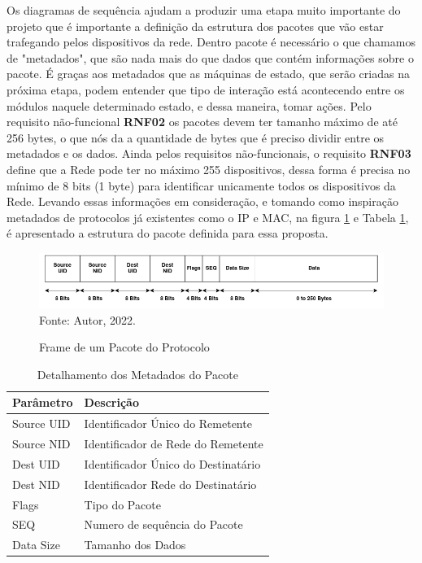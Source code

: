 Os diagramas de sequência ajudam a produzir uma etapa muito
importante do projeto que é importante a definição da
estrutura dos pacotes que vão estar trafegando pelos dispositivos da rede.
Dentro pacote é necessário o que chamamos de "metadados", que são
nada mais do que dados que contém informações sobre o pacote.
É graças aos metadados que as máquinas de estado, que serão criadas na próxima etapa,
podem entender que tipo de interação está acontecendo entre os módulos
naquele determinado estado, e dessa maneira, tomar ações. Pelo requisito
não-funcional \textbf{RNF02} os pacotes devem ter tamanho
máximo de até 256 bytes, o que nós da a quantidade de bytes que é preciso dividir
entre os metadados e os dados. Ainda pelos requisitos não-funcionais, o
requisito \textbf{RNF03} define que a Rede pode ter no máximo 255 dispositivos,
dessa forma é precisa no mínimo de 8 bits (1 byte) para identificar unicamente
todos os dispositivos da Rede. Levando essas informações em consideração, e
tomando como inspiração metadados de protocolos já existentes como o IP e MAC,
na figura \ref{fig:frame} e Tabela \ref{tab:metadata}, é apresentado a estrutura
do pacote definida para essa proposta.

\begin{figure}[htp]
    \centering
	\caption{Frame de um Pacote do Protocolo}
    \includegraphics[width=\textwidth]{img/frame.drawio.png}
    \label{fig:frame}
    Fonte: Autor, 2022.
\end{figure}

\begin{longtable}{|l|l|}
    \caption{Detalhamento dos Metadados do Pacote}\label{tab:metadata}\\
    \hline
    Parâmetro & Descrição \\
    \hline
    Source UID & Identificador Único do Remetente \\
    \hline
    Source NID & Identificador de Rede do Remetente \\
    \hline
    Dest UID & Identificador Único do Destinatário \\
    \hline
    Dest NID & Identificador Rede do Destinatário \\
    \hline
    Flags & Tipo do Pacote \\
    \hline
    SEQ & Numero de sequência do Pacote \\
    \hline
    Data Size & Tamanho dos Dados \\
    \hline
\end{longtable}

